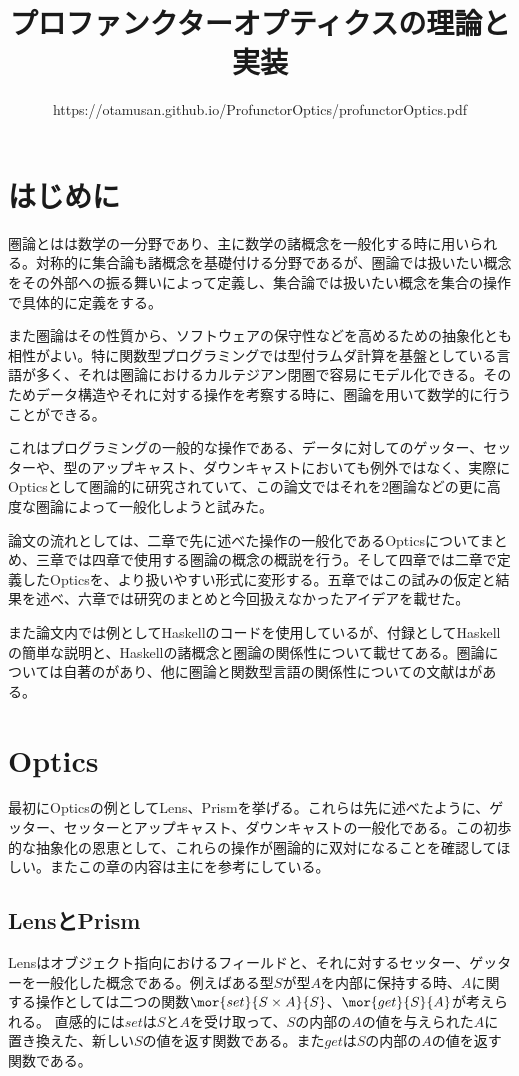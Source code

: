 \documentclass[uplatex,dvipdfmx]{jsarticle}
\begin{document}
  \title{プロファンクターオプティクスの理論と実装}
  \author{https://otamusan.github.io/ProfunctorOptics/profunctorOptics.pdf}
  \maketitle

	\tableofcontents
  \pagebreak
  \section{はじめに}
  圏論とはは数学の一分野であり、主に数学の諸概念を一般化する時に用いられる。対称的に集合論も諸概念を基礎付ける分野であるが、圏論では扱いたい概念をその外部への振る舞いによって定義し、集合論では扱いたい概念を集合の操作で具体的に定義をする。

  また圏論はその性質から、ソフトウェアの保守性などを高めるための抽象化とも相性がよい。特に関数型プログラミングでは型付ラムダ計算を基盤としている言語が多く、それは圏論におけるカルテジアン閉圏で容易にモデル化できる。そのためデータ構造やそれに対する操作を考察する時に、圏論を用いて数学的に行うことができる。

  これはプログラミングの一般的な操作である、データに対してのゲッター、セッターや、型のアップキャスト、ダウンキャストにおいても例外ではなく、実際にOpticsとして圏論的に研究されていて、この論文ではそれを2圏論などの更に高度な圏論によって一般化しようと試みた。

  論文の流れとしては、二章で先に述べた操作の一般化であるOpticsについてまとめ、三章では四章で使用する圏論の概念の概説を行う。そして四章では二章で定義したOpticsを、より扱いやすい形式に変形する。五章ではこの試みの仮定と結果を述べ、六章では研究のまとめと今回扱えなかったアイデアを載せた。

  また論文内では例としてHaskellのコードを使用しているが、付録としてHaskellの簡単な説明と、Haskellの諸概念と圏論の関係性について載せてある。圏論については自著の\cite{cti}があり、他に圏論と関数型言語の関係性についての文献は\cite{dao_of_fp}がある。
  \section{Optics}
  最初にOpticsの例としてLens、Prismを挙げる。これらは先に述べたように、ゲッター、セッターとアップキャスト、ダウンキャストの一般化である。この初歩的な抽象化の恩恵として、これらの操作が圏論的に双対になることを確認してほしい。またこの章の内容は主に\cite{categories_of_optics}を参考にしている。

  \subsection{LensとPrism}
  Lensはオブジェクト指向におけるフィールドと、それに対するセッター、ゲッターを一般化した概念である。例えばある型$S$が型$A$を内部に保持する時、$A$に関する操作としては二つの関数$\mor{set}{S\times A}{S}$、$\mor{get}{S}{A}$が考えられる。
  直感的には$set$は$S$と$A$を受け取って、$S$の内部の$A$の値を与えられた$A$に置き換えた、新しい$S$の値を返す関数である。また$get$は$S$の内部の$A$の値を返す関数である。
  
\end{document}
